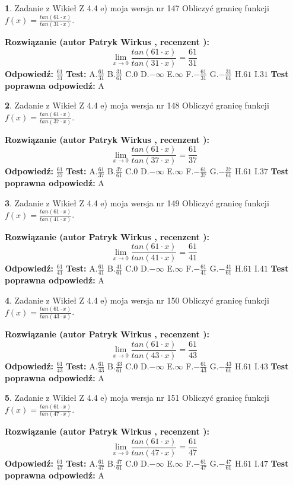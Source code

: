 \documentclass[12pt, a4paper]{article}
\theoremstyle{definition} %
\newtheorem{zad}{}
\newcommand{\zadStart}[1]{\begin{zad}#1\newline}
\newcommand{\zadStop}{\end{zad}}
\newcommand{\rozwStart}[2]{\noindent \textbf{Rozwiązanie (autor #1 , recenzent #2): }\newline}
\newcommand{\rozwStop}{\newline}
\newcommand{\odpStart}{\noindent \textbf{Odpowiedź:}\newline}
\newcommand{\odpStop}{\newline}
\newcommand{\testStart}{\noindent \textbf{Test:}\newline}
\newcommand{\testStop}{\newline}
\newcommand{\kluczStart}{\noindent \textbf{Test poprawna odpowiedź:}\newline}
\newcommand{\kluczStop}{\newline}
\begin{document}
\zadStart{Zadanie z Wikieł Z 4.4 e) moja wersja nr 147}
Obliczyć granicę funkcji $f(x)=\frac{tan(61\cdot x)}{tan(31\cdot x)}$.
\zadStop
\rozwStart{Patryk Wirkus}{}
$$\lim\limits_{x\to 0}\frac{tan(61\cdot x)}{tan(31\cdot x)}=
\frac{61}{31}$$
\rozwStop
\odpStart
$\frac{61}{31}$
\odpStop
\testStart
A.$\frac{61}{31}$
B.$\frac{31}{61}$
C.$0$
D.$-\infty$
E.$\infty$
F.$-\frac{61}{31}$
G.$-\frac{31}{61}$
H.$61$
I.$31$
\testStop
\kluczStart
A
\kluczStop



\zadStart{Zadanie z Wikieł Z 4.4 e) moja wersja nr 148}
Obliczyć granicę funkcji $f(x)=\frac{tan(61\cdot x)}{tan(37\cdot x)}$.
\zadStop
\rozwStart{Patryk Wirkus}{}
$$\lim\limits_{x\to 0}\frac{tan(61\cdot x)}{tan(37\cdot x)}=
\frac{61}{37}$$
\rozwStop
\odpStart
$\frac{61}{37}$
\odpStop
\testStart
A.$\frac{61}{37}$
B.$\frac{37}{61}$
C.$0$
D.$-\infty$
E.$\infty$
F.$-\frac{61}{37}$
G.$-\frac{37}{61}$
H.$61$
I.$37$
\testStop
\kluczStart
A
\kluczStop



\zadStart{Zadanie z Wikieł Z 4.4 e) moja wersja nr 149}
Obliczyć granicę funkcji $f(x)=\frac{tan(61\cdot x)}{tan(41\cdot x)}$.
\zadStop
\rozwStart{Patryk Wirkus}{}
$$\lim\limits_{x\to 0}\frac{tan(61\cdot x)}{tan(41\cdot x)}=
\frac{61}{41}$$
\rozwStop
\odpStart
$\frac{61}{41}$
\odpStop
\testStart
A.$\frac{61}{41}$
B.$\frac{41}{61}$
C.$0$
D.$-\infty$
E.$\infty$
F.$-\frac{61}{41}$
G.$-\frac{41}{61}$
H.$61$
I.$41$
\testStop
\kluczStart
A
\kluczStop



\zadStart{Zadanie z Wikieł Z 4.4 e) moja wersja nr 150}
Obliczyć granicę funkcji $f(x)=\frac{tan(61\cdot x)}{tan(43\cdot x)}$.
\zadStop
\rozwStart{Patryk Wirkus}{}
$$\lim\limits_{x\to 0}\frac{tan(61\cdot x)}{tan(43\cdot x)}=
\frac{61}{43}$$
\rozwStop
\odpStart
$\frac{61}{43}$
\odpStop
\testStart
A.$\frac{61}{43}$
B.$\frac{43}{61}$
C.$0$
D.$-\infty$
E.$\infty$
F.$-\frac{61}{43}$
G.$-\frac{43}{61}$
H.$61$
I.$43$
\testStop
\kluczStart
A
\kluczStop



\zadStart{Zadanie z Wikieł Z 4.4 e) moja wersja nr 151}
Obliczyć granicę funkcji $f(x)=\frac{tan(61\cdot x)}{tan(47\cdot x)}$.
\zadStop
\rozwStart{Patryk Wirkus}{}
$$\lim\limits_{x\to 0}\frac{tan(61\cdot x)}{tan(47\cdot x)}=
\frac{61}{47}$$
\rozwStop
\odpStart
$\frac{61}{47}$
\odpStop
\testStart
A.$\frac{61}{47}$
B.$\frac{47}{61}$
C.$0$
D.$-\infty$
E.$\infty$
F.$-\frac{61}{47}$
G.$-\frac{47}{61}$
H.$61$
I.$47$
\testStop
\kluczStart
A
\kluczStop
\end{document}
